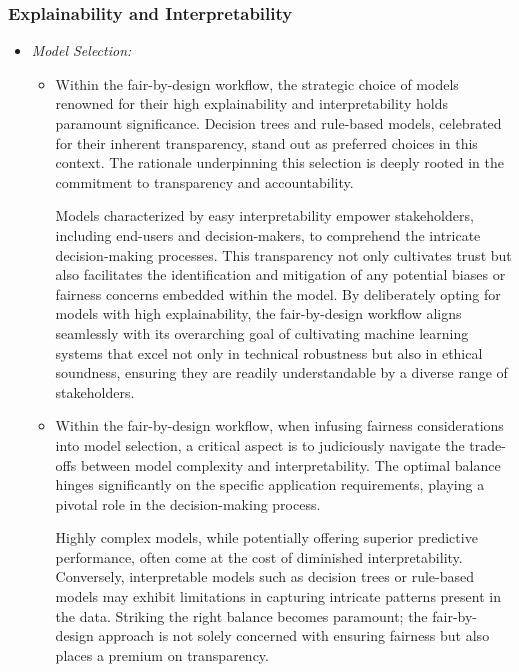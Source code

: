 \subsubsection{Explainability and Interpretability}

\begin{itemize}

    \item \emph{Model Selection:}

    \begin{itemize}

        \item Within the fair-by-design workflow, the strategic choice of models renowned for their high explainability and interpretability holds paramount significance. Decision trees and rule-based models, celebrated for their inherent transparency, stand out as preferred choices in this context. The rationale underpinning this selection is deeply rooted in the commitment to transparency and accountability.

        Models characterized by easy interpretability empower stakeholders, including end-users and decision-makers, to comprehend the intricate decision-making processes. This transparency not only cultivates trust but also facilitates the identification and mitigation of any potential biases or fairness concerns embedded within the model. By deliberately opting for models with high explainability, the fair-by-design workflow aligns seamlessly with its overarching goal of cultivating machine learning systems that excel not only in technical robustness but also in ethical soundness, ensuring they are readily understandable by a diverse range of stakeholders.

        \item Within the fair-by-design workflow, when infusing fairness considerations into model selection, a critical aspect is to judiciously navigate the trade-offs between model complexity and interpretability. The optimal balance hinges significantly on the specific application requirements, playing a pivotal role in the decision-making process.

        Highly complex models, while potentially offering superior predictive performance, often come at the cost of diminished interpretability. Conversely, interpretable models such as decision trees or rule-based models may exhibit limitations in capturing intricate patterns present in the data. Striking the right balance becomes paramount; the fair-by-design approach is not solely concerned with ensuring fairness but also places a premium on transparency.
        

\end{itemize}
\end{itemize}
